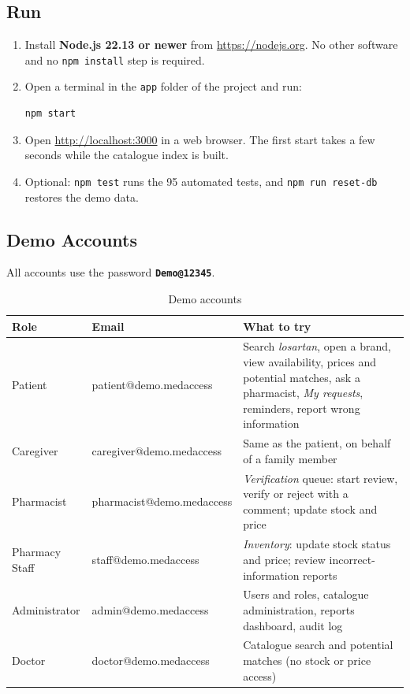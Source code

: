 \documentclass[11pt,a4paper]{article}
\begin{document}
\subsection{Run}
\begin{enumerate}
\item Install \textbf{Node.js 22.13 or newer} from \url{https://nodejs.org}. No other software and no \texttt{npm install} step is required.
\item Open a terminal in the \texttt{app} folder of the project and run:
\begin{verbatim}
npm start
\end{verbatim}
\item Open \url{http://localhost:3000} in a web browser. The first start takes a few seconds while the catalogue index is built.
\item Optional: \texttt{npm test} runs the 95 automated tests, and \texttt{npm run reset-db} restores the demo data.
\end{enumerate}

\subsection{Demo Accounts}
All accounts use the password \textbf{\texttt{Demo@12345}}.

\begin{table}[H]
\caption{Demo accounts}
\label{tab:accounts}
\centering
\small
\begin{tabularx}{\textwidth}{@{}l>{\ttfamily}lX@{}}
\toprule
Role & \normalfont Email & What to try \\
\midrule
Patient        & patient@demo.medaccess    & Search \emph{losartan}, open a brand, view availability, prices and potential matches, ask a pharmacist, \emph{My requests}, reminders, report wrong information \\
Caregiver      & caregiver@demo.medaccess  & Same as the patient, on behalf of a family member \\
Pharmacist     & pharmacist@demo.medaccess & \emph{Verification} queue: start review, verify or reject with a comment; update stock and price \\
Pharmacy Staff & staff@demo.medaccess      & \emph{Inventory}: update stock status and price; review incorrect-information reports \\
Administrator  & admin@demo.medaccess      & Users and roles, catalogue administration, reports dashboard, audit log \\
Doctor         & doctor@demo.medaccess     & Catalogue search and potential matches (no stock or price access) \\
\bottomrule
\end{tabularx}
\end{table}
\end{document}
